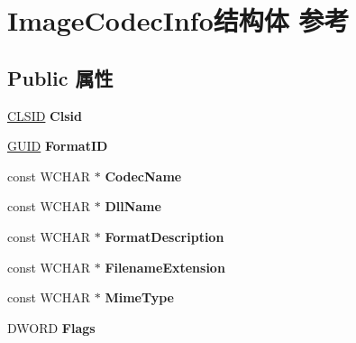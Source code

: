 \hypertarget{struct_image_codec_info}{}\section{Image\+Codec\+Info结构体 参考}
\label{struct_image_codec_info}
\subsection*{Public 属性}
\begin{DoxyCompactItemize}
\item 
\mbox{\label{struct_image_codec_info_a02acca4f999d438aa17e4f71f82e8fbb}} 
\hyperlink{struct___i_i_d}{C\+L\+S\+ID} {\bfseries Clsid}
\item 
\mbox{\label{struct_image_codec_info_abd6e856e7630adebf658523a52535897}} 
\hyperlink{interface_g_u_i_d}{G\+U\+ID} {\bfseries Format\+ID}
\item 
\mbox{\label{struct_image_codec_info_a7abf90b776b30348813d1472d3274cd2}} 
const W\+C\+H\+AR $\ast$ {\bfseries Codec\+Name}
\item 
\mbox{\label{struct_image_codec_info_a34b72b17e73feff1744dca514671bc63}} 
const W\+C\+H\+AR $\ast$ {\bfseries Dll\+Name}
\item 
\mbox{\label{struct_image_codec_info_aca9a6cb92b9926a74a1b177febccecdd}} 
const W\+C\+H\+AR $\ast$ {\bfseries Format\+Description}
\item 
\mbox{\label{struct_image_codec_info_ac70554f66a9754aa9b745d6f31e91ebd}} 
const W\+C\+H\+AR $\ast$ {\bfseries Filename\+Extension}
\item 
\mbox{\label{struct_image_codec_info_ab5c5842c1f4730cff528bea380e691f6}} 
const W\+C\+H\+AR $\ast$ {\bfseries Mime\+Type}
\item 
\mbox{\label{struct_image_codec_info_a0bfa7ef30f14c183d013b40a27cc451e}} 
D\+W\+O\+RD {\bfseries Flags}
\item 
\mbox{\label{struct_image_codec_info_a01a7b9752d81f91190f3ee16ff1d4099}} 

\end{DoxyCompactItemize}
